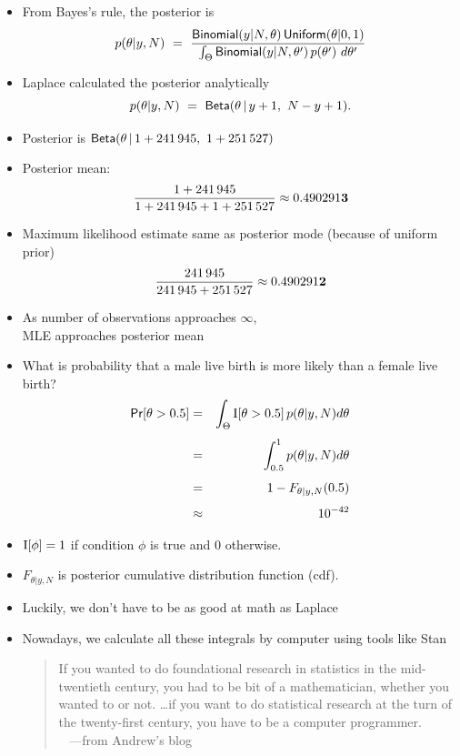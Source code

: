 \documentclass[10pt]{report}
\begin{document}
\begin{itemize}
\item From Bayes's rule, the posterior is
\[
p(\theta|y,N) 
\ = \ 
\frac{\distro{Binomial}(y|N,\theta) \, \distro{Uniform}(\theta|0,1)}
     {\int_{\Theta} \distro{Binomial}(y|N,\theta') \,  p(\theta')
       \ d\theta'}
\]
\item Laplace calculated the posterior analytically
\[
p(\theta|y,N) 
\ = \ \text{\sf Beta}(\theta \, | \, y + 1, \ N - y + 1).
\]
\end{itemize}

\begin{itemize}
\item Posterior is $\text{\sf Beta}(\theta \, | \, 1 + 241\,945, \ 1 + 251\,527)$
\item Posterior mean: 
\[
\frac{1 + 241\,945}
     {1 + 241\,945 + 1 + 251\,527}
\approx 0.490291{\bf3}
\]
\item Maximum likelihood estimate same as posterior mode (because
  of uniform prior) 
\[
\frac{241\,945}
     {241\,945 + 251\,527}
\approx 0.490291{\bf2}
\]
\item As number of observations approaches $\infty$, 
\\
MLE approaches posterior mean
\end{itemize}

\begin{itemize}
\item What is probability that a male live birth is more likely than a
  female live birth?
\begin{eqnarray*}
\text{\sf Pr}[\theta > 0.5] 
& = &  \int_{\Theta} \text{I}[\theta > 0.5] \, p(\theta|y,N) d\theta
\\[4pt]
& = &  \int_{0.5}^1 p(\theta|y,N) d\theta
\\[4pt]
& = &  1 - F_{\theta|y,N}(0.5)
\\[4pt]
& \approx &  10^{-42}
\end{eqnarray*}
\item $\text{I}[\phi] = 1$ if condition $\phi$ is true and 0 otherwise.
\item  $F_{\theta|y,N}$ is posterior cumulative distribution
function (cdf).
\end{itemize}

\begin{itemize}
\item Luckily, we don't have to be as good at math as Laplace
\item Nowadays, we calculate all these integrals by computer using
  tools like Stan
\vfill
\begin{quote}
  If you wanted to do foundational research in statistics in the
  mid-twentieth century, you had to be bit of a mathematician, whether
  you wanted to or not. \ldots if you want to do statistical research
  at the turn of the twenty-first century, you have to be a computer
  programmer.  \\[3pt] \mbox{ } \hfill {\small ---from Andrew's blog}
\end{quote}
\end{itemize}
\end{document}
